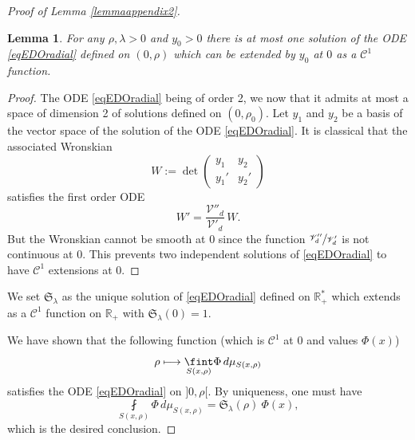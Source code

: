 \documentclass[JEP,XML,SOM,Unicode,NoFloatCountersInSection,published]{cedram}
\let\mathcal\mathscr
\def\mto{\mathchoice{\longmapsto}{\mapsto}{\mapsto}{\mapsto}}
\theoremstyle{plain}
\newtheorem{lemma}[equation]{Lemma}
\theoremstyle{definition}
\newcommand{\RR}{\mathbb{R}}
\newcommand{\finte}[3]{\underset{#1}{\fint} {#2} \, {#3}}
\begin{document}
\begin{proof}[Proof of Lemma \ref{lemmaappendix2}]
\begin{lemma}
\label{lemmeEDOradial}
For any $\rho, \lambda >0$ and $y_0 > 0$ there is at most one solution of the ODE \eqref{eqEDOradial} defined on $(0,\rho)$ which can be extended by $y_0$ at $0$ as a $\mathcal{C}^1$ function.
\end{lemma}

\begin{proof}
The ODE \eqref{eqEDOradial} being of order 2, we now that it admits at most a space of dimension 2 of solutions defined on $(0,\rho_0)$. Let $y_1$ and $y_2$ be a basis of the vector space of the solution of the ODE \eqref{eqEDOradial}. It is classical that the associated Wronskian
\[
W := \det \begin{pmatrix}
y_1 & y_2 \\ y_1' & y_2'
\end{pmatrix}
\]
satisfies the first order ODE
\[
W' = \frac{\mathcal{V}''_d}{\mathcal{V}'_d} \, W.
\]
But the Wronskian cannot be smooth at $0$ since the function $\sfrac{\mathcal{V}''_d}{\mathcal{V}'_d}$ is not continuous at $0$. This prevents two independent solutions of \eqref{eqEDOradial} to have $\mathcal{C}^1$ extensions at $0$.
\end{proof}

We set $\mathfrak{S}_{\lambda}$ as the unique solution of \eqref{eqEDOradial} defined on $\RR_+^*$ which extends as a $\mathcal{C}^1$ function on $\RR_+$ with $\mathfrak{S}_{\lambda}(0) =1$.

We have shown that the following function (which is $\mathcal{C}^1$ at $0$ and values $\Phi(x)$)
\[
\rho \mto \finte{S(x, \rho)}{\Phi}{ d \mu_{S(x,\rho)}}
\]
satisfies the ODE \eqref{eqEDOradial} on $]0,\rho[$. By uniqueness, one must have
\[
\finte{S(x, \rho)}{\Phi}{ d \mu_{S(x,\rho)}} = \mathfrak{S}_{\lambda}(\rho) \ \Phi(x),
\]
which is the desired conclusion.
\end{proof}

\backmatter


\end{document}
